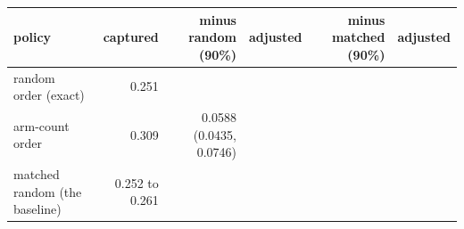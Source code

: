 \begin{tabular}{lrrrrr}
\toprule
policy & captured & minus random (90\%) & adjusted & minus matched (90\%) & adjusted \\
\midrule
random order (exact) & 0.251 &  &  &  &  \\
arm-count order & 0.309 & 0.0588 (0.0435, 0.0746) &  &  &  \\
matched random (the baseline) & 0.252 to 0.261 &  &  &  &  \\

\end{tabular}
